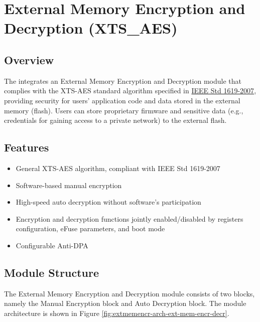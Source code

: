 \documentclass[main\_\_EN.tex]{subfiles}
\begin{document}

\ifglobal
\else
    {\let\clearpage\relax \listoftodos}
    {\let\clearpage\relax \listofdonetodos}
    \tableofcontents
\fi




\hypertarget{extmemencr}{}
\chapter{External Memory Encryption and Decryption (XTS\_AES)}
\label{mod:extmemencr}

\section{Overview}

The \chipname{} integrates an External Memory Encryption and Decryption module that complies with the XTS-AES standard algorithm specified in \href{https://ieeexplore.ieee.org/document/4493450}{IEEE Std 1619-2007}, providing security for users' application code and data stored in the external memory (flash). Users can store proprietary firmware and sensitive data (e.g., credentials for gaining access to a private network) to the external flash.

\section{Features}

\begin{itemize}
    \item General XTS-AES algorithm, compliant with IEEE Std 1619-2007
    \item Software-based manual encryption
    \item High-speed auto decryption without software's participation
    \item Encryption and decryption functions jointly enabled/disabled by registers configuration, eFuse parameters, and boot mode
    \item Configurable Anti-DPA
\end{itemize}


\section{Module Structure}
The External Memory Encryption and Decryption module consists of two blocks, namely the Manual Encryption block and Auto Decryption block. The module architecture is shown in Figure \ref{fig:extmemencr-arch-ext-mem-encr-decr}.
\end{document}
